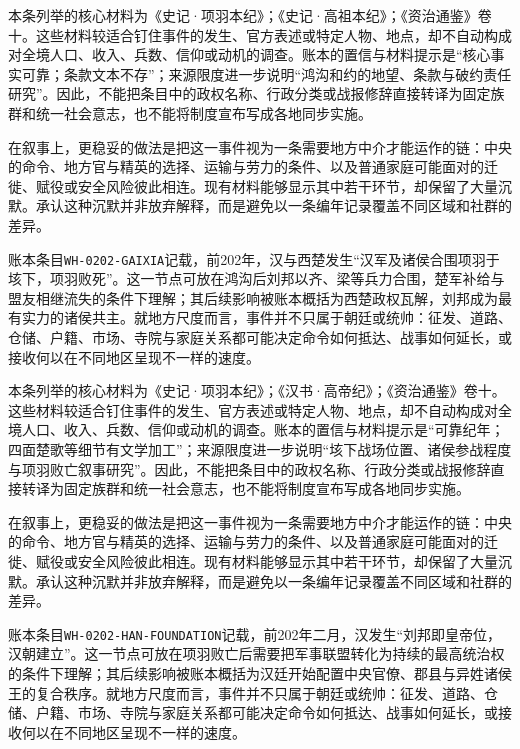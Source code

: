 本条列举的核心材料为《史记·项羽本纪》；《史记·高祖本纪》；《资治通鉴》卷十。这些材料较适合钉住事件的发生、官方表述或特定人物、地点，却不自动构成对全境人口、收入、兵数、信仰或动机的调查。账本的置信与材料提示是“核心事实可靠；条款文本不存”；来源限度进一步说明“鸿沟和约的地望、条款与破约责任研究”。因此，不能把条目中的政权名称、行政分类或战报修辞直接转译为固定族群和统一社会意志，也不能将制度宣布写成各地同步实施。

在叙事上，更稳妥的做法是把这一事件视为一条需要地方中介才能运作的链：中央的命令、地方官与精英的选择、运输与劳力的条件、以及普通家庭可能面对的迁徙、赋役或安全风险彼此相连。现有材料能够显示其中若干环节，却保留了大量沉默。承认这种沉默并非放弃解释，而是避免以一条编年记录覆盖不同区域和社群的差异。

账本条目\texttt{WH-0202-GAIXIA}记载，前202年，汉与西楚发生“汉军及诸侯合围项羽于垓下，项羽败死”。这一节点可放在鸿沟后刘邦以齐、梁等兵力合围，楚军补给与盟友相继流失的条件下理解；其后续影响被账本概括为西楚政权瓦解，刘邦成为最有实力的诸侯共主。就地方尺度而言，事件并不只属于朝廷或统帅：征发、道路、仓储、户籍、市场、寺院与家庭关系都可能决定命令如何抵达、战事如何延长，或接收何以在不同地区呈现不一样的速度。

本条列举的核心材料为《史记·项羽本纪》；《汉书·高帝纪》；《资治通鉴》卷十。这些材料较适合钉住事件的发生、官方表述或特定人物、地点，却不自动构成对全境人口、收入、兵数、信仰或动机的调查。账本的置信与材料提示是“可靠纪年；四面楚歌等细节有文学加工”；来源限度进一步说明“垓下战场位置、诸侯参战程度与项羽败亡叙事研究”。因此，不能把条目中的政权名称、行政分类或战报修辞直接转译为固定族群和统一社会意志，也不能将制度宣布写成各地同步实施。

在叙事上，更稳妥的做法是把这一事件视为一条需要地方中介才能运作的链：中央的命令、地方官与精英的选择、运输与劳力的条件、以及普通家庭可能面对的迁徙、赋役或安全风险彼此相连。现有材料能够显示其中若干环节，却保留了大量沉默。承认这种沉默并非放弃解释，而是避免以一条编年记录覆盖不同区域和社群的差异。

账本条目\texttt{WH-0202-HAN-FOUNDATION}记载，前202年二月，汉发生“刘邦即皇帝位，汉朝建立”。这一节点可放在项羽败亡后需要把军事联盟转化为持续的最高统治权的条件下理解；其后续影响被账本概括为汉廷开始配置中央官僚、郡县与异姓诸侯王的复合秩序。就地方尺度而言，事件并不只属于朝廷或统帅：征发、道路、仓储、户籍、市场、寺院与家庭关系都可能决定命令如何抵达、战事如何延长，或接收何以在不同地区呈现不一样的速度。

